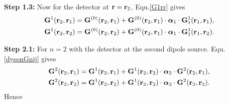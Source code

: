 {\bf{Step 1.3:}} Now for the detector at $\mathbf{r}=\mathbf{r}_2$, Equ.\eqref{G1rr} gives
\begin{subequations}
\begin{align}
\mathbf{G}^1(\mathbf{r}_2,\mathbf{r}_1)
&= \mathbf{G}^{(0)}(\mathbf{r}_2,\mathbf{r}_1)+{\mathbf{G}^{(0)}(\mathbf{r}_2,\mathbf{r}_1) \cdot {\bm \alpha}_1\cdot \mathbf{G}^1_1(\mathbf{r}_1,\mathbf{r}_1)},\label{G121_2}\\
\mathbf{G}^1(\mathbf{r}_2,\mathbf{r}_2)
&=\mathbf{G}^{(0)}(\mathbf{r}_2,\mathbf{r}_2)+{\mathbf{G}^{(0)}(\mathbf{r}_2,\mathbf{r}_1) \cdot {\bm \alpha}_1\cdot \mathbf{G}^1_1(\mathbf{r}_1,\mathbf{r}_2)}.\label{G122_2}
\end{align}
\end{subequations}

{\textbf {Step 2.1:}} For $n=2$ with the detector at the second dipole source.
Equ.\eqref{dysonGnij} gives
\begin{subequations}
\begin{align}
\mathbf{G}^2(\mathbf{r}_2,\mathbf{r}_1)
&= \mathbf{G}^1(\mathbf{r}_2,\mathbf{r}_1)+{\mathbf{G}^1(\mathbf{r}_2,\mathbf{r}_2) \cdot {\bm \alpha}_2\cdot \mathbf{G}^2(\mathbf{r}_2,\mathbf{r}_1)},\\
\mathbf{G}^2(\mathbf{r}_2,\mathbf{r}_2)
&= \mathbf{G}^1(\mathbf{r}_2,\mathbf{r}_2)+{\mathbf{G}^1(\mathbf{r}_2,\mathbf{r}_2) \cdot {\bm \alpha}_2\cdot \mathbf{G}^2(\mathbf{r}_2,\mathbf{r}_2)}.
\end{align}
\end{subequations}
Hence
